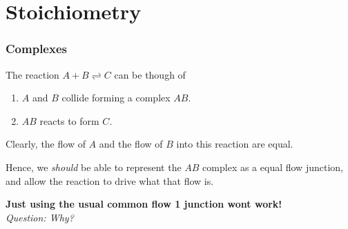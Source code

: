 \documentclass[10pt,reqno]{beamer}
\begin{document}
\section{Stoichiometry}
\begin{frame}
\frametitle{Complexes}
The reaction $A + B \rightleftharpoons C$ can be though of
\begin{enumerate}
	\item $A$ and $B$ collide forming a complex $AB$.
	\item $AB$ reacts to form $C$. 
\end{enumerate}
\vfill

Clearly, the flow of $A$ and the flow of $B$ into this reaction are equal.
\vfill

Hence, we \emph{should} be able to represent the $AB$ complex as a equal flow junction, and allow the reaction to drive what that flow is.

\begin{center}
\textbf{Just using the usual common flow 1 junction wont work!}\\
\vspace{10pt}
\emph{Question: Why?}
\end{center}
\end{frame}
\end{document}
